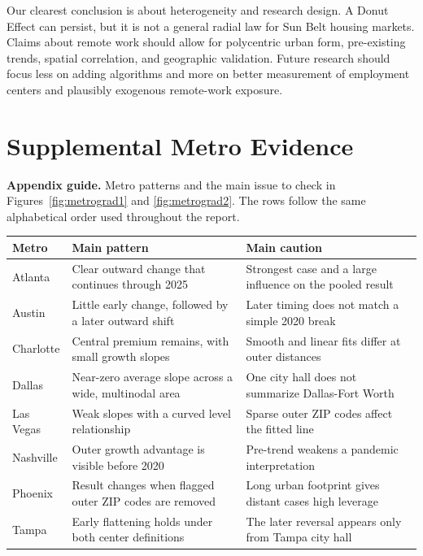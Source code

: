 \documentclass[11pt]{article}
\begin{document}
Our clearest conclusion is about heterogeneity and research design. A Donut Effect can persist, but it is not a general
radial law for Sun Belt housing markets. Claims about remote work should allow for polycentric urban form, pre-existing trends,
spatial correlation, and geographic validation. Future research should focus less on adding algorithms and more on better
measurement of employment centers and plausibly exogenous remote-work exposure.

\clearpage
\appendix
\section{Supplemental Metro Evidence}

\begin{table}[H]\centering
{\small\raggedright\textbf{Appendix guide.} Metro patterns and the main issue to check in Figures~\ref{fig:metrograd1} and
\ref{fig:metrograd2}. The rows follow the same alphabetical order used throughout the report.\par}\vspace{4pt}
\small
\begin{tabular}{p{.16\linewidth}p{.38\linewidth}p{.36\linewidth}}
\toprule
Metro & Main pattern & Main caution \\
\midrule
Atlanta & Clear outward change that continues through 2025 & Strongest case and a large influence on the pooled result \\
Austin & Little early change, followed by a later outward shift & Later timing does not match a simple 2020 break \\
Charlotte & Central premium remains, with small growth slopes & Smooth and linear fits differ at outer distances \\
Dallas & Near-zero average slope across a wide, multinodal area & One city hall does not summarize Dallas-Fort Worth \\
Las Vegas & Weak slopes with a curved level relationship & Sparse outer ZIP codes affect the fitted line \\
Nashville & Outer growth advantage is visible before 2020 & Pre-trend weakens a pandemic interpretation \\
Phoenix & Result changes when flagged outer ZIP codes are removed & Long urban footprint gives distant cases high leverage \\
Tampa & Early flattening holds under both center definitions & The later reversal appears only from Tampa city hall \\
\bottomrule
\end{tabular}
\end{table}
\end{document}

